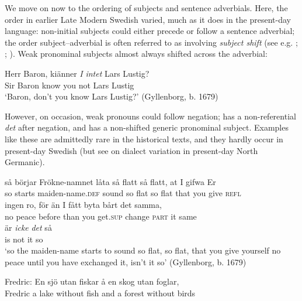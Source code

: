 \documentclass[output=paper]{langscibook}
\begin{document}
We move on now to the ordering of subjects and sentence adverbials. Here, the order in earlier Late Modern Swedish varied, much as it does in the present-day language: non-initial subjects could either precede or follow a sentence adverbial; the order subject–adverbial is often referred to as involving \textit{subject shift} (see e.g. \citealt{Holmberg1993}; \citealt{Svenonius2002}; \citealt{Andreasson2007}). Weak pronominal subjects almost always shifted across the adverbial:


\ea\label{ex:intro:13}
\gll  Herr Baron,   kiänner \textit{I} \textit{intet} Lars Lustig? \\
Sir      Baron  know    you not     Lars Lustig\\
\glt ‘Baron, don’t you know Lars Lustig?’ (Gyllenborg, b. 1679)
\z


However, on occasion, weak pronouns could follow negation;  has a non-referential \textit{det} after negation, and  has a non-shifted generic pronominal subject. Examples like these are admittedly rare in the historical texts, and they hardly occur in present-day Swedish (but see \citealt{Bentzen2014} on dialect variation in present-day North Germanic).


\ea\label{ex:intro:14}
\ea\label{ex:intro:14a}
\gll  så börjar   Frökne-namnet     låta       så flatt så flatt,   at   I     gifwa   Er \\
  so starts   maiden-name.\textsc{def}    sound   so flat   so flat   that you   give   \textsc{refl} \\

  \gll  ingen ro,     för     än   I       fått       byta     bårt det samma, \\
    no       peace   before than you   get\textsc{.sup} change \textsc{part}   it same   \\

\gll  är \textit{icke} \textit{det} så \\
 is   not     it     so \\
\glt ‘so the maiden-name starts to sound so flat, so flat, that you give yourself no peace until you have exchanged it, isn’t it so’ (Gyllenborg, b. 1679)


\ex\label{ex:intro:14b}
\gll Fredric: En   sjö   utan     fiskar å     en skog     utan     foglar,\\
    Fredric  a     lake   without   fish   and   a   forest   without   birds \\
\end{document}
